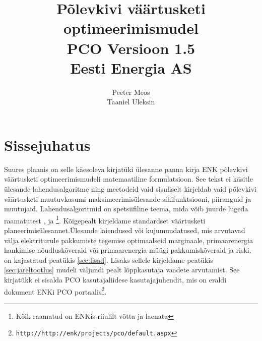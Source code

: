 \documentclass[10pt,a4paper]{article}
\author{Peeter Meos\\Taaniel Uleksin}
\title{Põlevkivi väärtusketi optimeerimismudel \\ 
PCO Versioon 1.5\\
Eesti Energia AS}
\begin{document}
\maketitle
\tableofcontents
\listoffigures
\listoftables

\section{Sissejuhatus}
Suures plaanis on selle käesoleva kirjatüki ülesanne panna kirja ENK põ\-lev\-kivi väärtusketi optimeerimismudeli matemaatiline formulatsioon. See tekst ei käsitle ülesande lahendusalgoritme ning meetodeid vaid sisuliselt kirjeldab vaid põlev\-kivi väärtusketi muutuvkasumi maksimeerimisülesande sihifunktsiooni, pii\-ranguid ja muutujaid. Lahendusalgoritmid on spetsiifiline teema, mida võib juurde lugeda raamatutest \cite{Hillier1995}, \cite{Rardin2000} ja \cite{Nodecal1999}\footnote{Kõik raamatud on ENKis riiulilt võtta ja laenata}. Kõigepealt kirjeldame standardset väärtusketi pla\-neeri\-mis\-ülesannet.Üles\-ande laiendused või kujumuudatused, mis arvu\-tavad väl\-ja elek\-tri\-turule pakkumiste tegemise optimaalseid marginaale, primaarenergia hankimise nõudlus\-kõveraid või primaar\-energia müügi pakkumis\-kõveraid ja riski, on kajastatud peatükis \ref{sec:lisad}. Lisaks sellele kirjeldame peatükis \ref{sec:jareltootlus} mudeli väljundi pealt lõpp\-kasutaja vaadete arvutamist. See kirjatükk ei sisalda PCO kasutajaliidese kasutajajuhendit, mis on eraldi dokument ENKi PCO portaalis\footnote{\texttt{http://http://enk/projects/pco/default.aspx}}.
\end{document}
